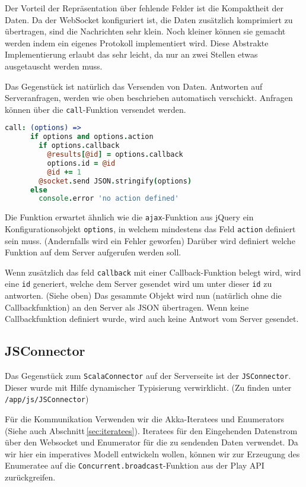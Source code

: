 Der Vorteil der Repräsentation über fehlende Felder ist die Kompaktheit der Daten. Da der WebSocket
konfiguriert ist, die Daten zusätzlich komprimiert zu übertragen, sind die Nachrichten sehr klein.
Noch kleiner können sie gemacht werden indem ein eigenes Protokoll implementiert wird. Diese
Abstrakte Implementierung erlaubt das sehr leicht, da nur an zwei Stellen etwas ausgetauscht werden
muss.

Das Gegenstück ist natürlich das Versenden von Daten. Antworten auf Serveranfragen, werden wie oben
beschrieben automatisch verschickt. Anfragen können über die \texttt{call}-Funktion versendet
werden.

\begin{lstlisting}[language=coffee] 
    call: (options) =>      
      if options and options.action        
        if options.callback
          @results[@id] = options.callback
          options.id = @id
          @id += 1
        @socket.send JSON.stringify(options)
      else
        console.error 'no action defined'
\end{lstlisting}

Die Funktion erwartet ähnlich wie die \texttt{ajax}-Funktion aus jQuery ein Konfigurationsobjekt
\texttt{options}, in welchem mindestens das Feld \texttt{action} definiert sein muss. (Andernfalls
wird ein Fehler geworfen) Darüber wird definiert welche Funktion auf dem Server aufgerufen werden
soll.

Wenn zusätzlich das feld \texttt{callback} mit einer Callback-Funktion belegt wird, wird eine
\texttt{id} generiert, welche dem Server gesendet wird um unter dieser \texttt{id} zu antworten.
(Siehe oben) Das gesammte Objekt wird nun (natürlich ohne die Callbackfunktion) an den Server als
JSON übertragen. Wenn keine Callbackfunktion definiert wurde, wird auch keine Antwort vom Server
gesendet.

\subsection{JSConnector}

Das Gegenstück zum \texttt{ScalaConnector} auf der Serverseite ist der \texttt{JSConnector}. Dieser
wurde mit Hilfe dynamischer Typisierung verwirklicht. (Zu finden unter \texttt{/app/js/JSConnector})

Für die Kommunikation Verwenden wir die Akka-Iteratees und Enumerators (Siehe auch
Abschnitt\,\ref{sec:iteratees}). Iteratees für den Eingehenden Datenstrom über den Websocket und
Enumerator für die zu sendenden Daten verwendet. Da wir hier ein imperatives Modell entwickeln
wollen, können wir zur Erzeugung des Enumeratee auf die \texttt{Concurrent.broadcast}-Funktion aus
der Play API zurückgreifen.

